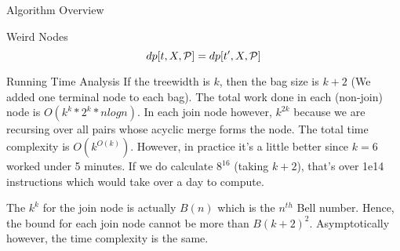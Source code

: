 \begin{section}{Algorithm Overview}
\begin{subsection}{Weird Nodes}
		$$dp[t, X, \mathcal{P}] = dp[t', X, \mathcal{P}]$$
	\end{subsection}

	\begin{subsection}{Running Time Analysis}
		If the treewidth is $k$, then the bag size is $k+2$ (We added one terminal node to each bag). The total work done in each (non-join) node is $O(k^k * 2 ^ k * nlogn)$. In each join node however, $k^{2k}$ because we are recursing over all pairs whose acyclic merge forms the node. The total time complexity is $O(k^{O(k)})$. However, in practice it's a little better since $k=6$ worked under 5 minutes. If we do calculate $8^16$ (taking $k+2$), that's over 1e14 instructions which would take over a day to compute. 
		
		The $k^k$ for the join node is actually $B(n)$ which is the $n^{th}$ Bell number. Hence, the bound for each join node cannot be more than $B(k+2)^2$. Asymptotically however, the time complexity is the same. 
	\end{subsection}

\end{section}